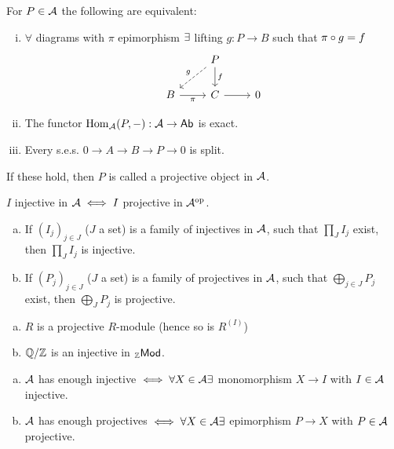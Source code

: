 \documentclass[a4paper]{report}
\begin{document}
\begin{thm-defi}For $P \in \mathcal{A}$ the following are equivalent:
  \begin{enumerate}[(i)]
    \item $\forall$ diagrams with $\pi$ epimorphism $\exists$ lifting $g: P \to B$ such that $\pi \circ g = f$
          \[\begin{tikzcd}
                    & P \arrow[ld, "g"', dashed] \arrow[d, "f"] &   \\
B \arrow[r, "\pi"'] & C \arrow[r]                               & 0
\end{tikzcd}\]
    \item The functor $\operatorname{Hom}_{\mathcal{A}}(P,-): \mathcal{A} \to \mathsf{Ab}$ is exact.
    \item Every s.e.s. $0 \to A \to B \to P \to 0$ is split.
  \end{enumerate}
  If these hold, then $P$ is called a projective object in $\mathcal{A}$.
\end{thm-defi}

\begin{rem*}
$I$ injective in $\mathcal{A}\iff I$ projective in $\mathcal{A}^\mathrm{op}$.
\end{rem*}

\begin{prop}
\begin{enumerate}[(a)]
  \item If $(I_{j})_{j \in J}$ ($J$ a set) is a family of injectives in $\mathcal{A}$, such that $\prod_{J}I_{j}$ exist, then $\prod_{J}I_{j}$ is injective.
  \item If $(P_{j})_{j \in J}$ ($J$ a set) is a family of projectives in $\mathcal{A}$, such that $\bigoplus_{j \in J}P_{j}$ exist, then $\bigoplus_{J}P_{j}$ is projective.
\end{enumerate}
\end{prop}

\begin{exmp}
\begin{enumerate}[(a)]
  \item $R$ is a projective $R$-module (hence so is $R^{(I)}$)
        \item $\fak \Q\Z$ is an injective in ${}_{\mathbb{Z}}\mathsf{Mod}$.
\end{enumerate}
\end{exmp}

\begin{defi}
\begin{enumerate}[(a)]
  \item $\mathcal{A}$ has enough injective $\iff \forall X\in \mathcal{A} \exists$ monomorphism $X \to I$ with $I \in \mathcal{A}$ injective.
  \item $\mathcal{A}$ has enough projectives $\iff \forall X \in \mathcal{A} \exists$ epimorphism $P \to X$ with $P \in \mathcal{A}$ projective.
\end{enumerate}

\end{defi}
\end{document}
